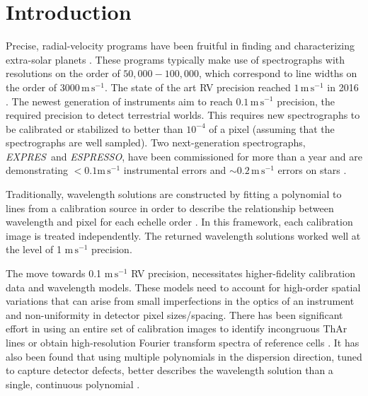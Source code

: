 \documentclass[twocolumn,table,xcolor,trackchanges]{aastex63}
\newcommand{\project}[1]{\textsl{#1}}
\newcommand{\acronym}[1]{{\small{#1}}}
\newcommand{\expres}{\project{\acronym{EXPRES}}}
\newcommand{\espresso}{\project{\acronym{ESPRESSO}}}
\newcommand{\mps}{\mathrm{m\,s^{-1}}}
\begin{document}
\section{Introduction} 
Precise, radial-velocity programs have been fruitful in finding and characterizing extra-solar planets \citep[e.g.][]{mayor2011, bonfils2013, plavchan2015, butler2017}.  These programs typically make use of spectrographs with resolutions on the order of $50,000-100,000$, which correspond to line widths on the order of $3000\,\mps$.  The state of the art RV precision reached $1\, \mps$ in 2016 .  The newest generation of instruments aim  to reach $0.1\,\mps$ precision, the required precision to detect terrestrial worlds.  This requires new spectrographs to be calibrated or stabilized to better than $10^{-4}$ of a pixel (assuming that the spectrographs are well sampled).  Two next-generation spectrographs, \expres\ and \espresso, have been commissioned for more than a year and are demonstrating $<0.1 \mps$ instrumental errors and $\sim 0.2\, \mps$ errors on stars \citep{pepe2013, jurgenson2016, blackman2020, petersburg2020, brewer2020, mascareno2020}.

Traditionally, wavelength solutions are constructed by fitting a polynomial to lines from a calibration source in order to describe the relationship between wavelength and pixel for each echelle order \citep{butler1996, lovis2007, cersullo2019}.  In this framework, each calibration image is treated independently.  The returned wavelength solutions worked well at the level of 1 $\mps$ precision.

The move towards 0.1 $\mps$ RV precision, necessitates higher-fidelity calibration data and wavelength models.  These models need to account for high-order spatial variations that can arise from small imperfections in the optics of an instrument and non-uniformity in detector pixel sizes/spacing.  There has been significant effort in using an entire set of calibration images to identify incongruous ThAr lines \citep{coffinet2019} or obtain high-resolution Fourier transform spectra of reference cells \citep{wang2020}.  It has also been found that using multiple polynomials in the dispersion direction, tuned to capture detector defects, better describes the wavelength solution than a single, continuous polynomial \citep{milakovic2020}.
\end{document}
